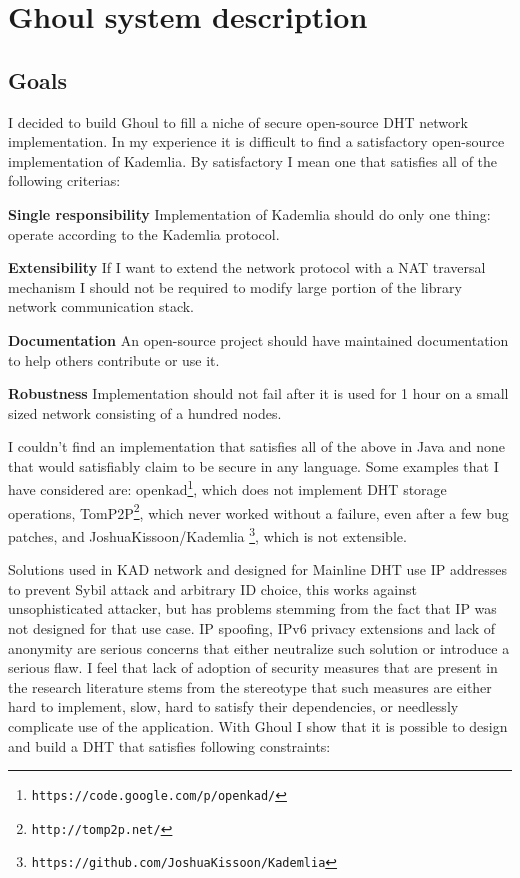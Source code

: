 \chapter{Ghoul system description}
\section{Goals}
I decided to build Ghoul to fill a niche of secure open-source DHT network
implementation. In my experience it is difficult to find a satisfactory
open-source implementation of Kademlia. By satisfactory I mean one that
satisfies all of the following criterias:

\begin{description}
  \item{\textbf{Single responsibility}} Implementation of Kademlia should do
    only one thing: operate according to the Kademlia protocol.
  \item{\textbf{Extensibility}} If I want to extend the network protocol with a
    NAT traversal mechanism I should not be required to modify large portion of
    the library network communication stack.
  \item{\textbf{Documentation}} An open-source project should have maintained
    documentation to help others contribute or use it.
  \item{\textbf{Robustness}} Implementation should not fail after it is used
    for 1 hour on a small sized network consisting of a hundred nodes.
\end{description}

I couldn't find an implementation that satisfies all of the above in Java and
none that would satisfiably claim to be secure in any language. Some examples
that I have considered are:
openkad\footnote{\texttt{https://code.google.com/p/openkad/}}, which does not
implement DHT storage operations, TomP2P\footnote{\texttt{http://tomp2p.net/}},
which never worked without a failure, even after a few bug patches, and
JoshuaKissoon/Kademlia
\footnote{\texttt{https://github.com/JoshuaKissoon/Kademlia}}, which is not
extensible.

Solutions used in KAD network and designed for Mainline DHT use IP addresses to
prevent Sybil attack and arbitrary ID choice, this works against unsophisticated
attacker, but has problems stemming from the fact that IP was not designed for
that use case. IP spoofing, IPv6 privacy extensions and lack of anonymity are
serious concerns that either neutralize such solution or introduce a serious
flaw. I feel that lack of adoption of security measures that are present in the
research literature stems from the stereotype that such measures are either hard
to implement, slow, hard to satisfy their dependencies, or
needlessly complicate use of the application. With Ghoul I show that it is
possible to design and build a DHT that satisfies following constraints:

